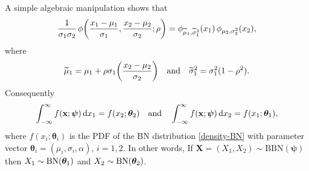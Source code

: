 \documentclass[12pt]{article}
\theoremstyle{definition}
\begin{document}
A simple algebraic manipulation shows that
\begin{align}\label{ident-binormal}
{1\over\sigma_1\sigma_2}\,
\phi\biggl({x_1-\mu_1\over \sigma_1},{x_2-\mu_2\over \sigma_2};\rho\biggr)
=
\phi_{\widetilde{\mu}_1, \widetilde{\sigma}_1^2}(x_1) \,
\phi_{\mu_2,\sigma_2^2}(x_2),
\end{align}
where
\begin{align*}
\widetilde{\mu}_1=\mu_1+\rho\sigma_1\biggl({x_2-\mu_2\over\sigma_2}\biggr)
\quad \text{and} \quad 
\widetilde{\sigma}_1^2=\sigma_1^2(1-\rho^2).
\end{align*}
Consequently
\begin{align*}
	\int_{-\infty}^{\infty}f({\bf x};\boldsymbol{\psi})\, {\rm d}x_1
	=
	f(x_2;\boldsymbol{\theta}_{2}) 
	\quad \text{and}\quad
	\int_{-\infty}^{\infty}f({\bf x};\boldsymbol{\psi})\, {\rm d}x_2
=
f(x_1;\boldsymbol{\theta}_{1}),
\end{align*}
where $f(x_i;\boldsymbol{\theta}_{i})$ is the PDF of the BN distribution \eqref{density-BN} with parameter vector $\boldsymbol{\theta}_{i}=(\mu_i,\sigma_i,\alpha)$, $i=1,2$. In other words, If $\boldsymbol{X}=(X_1,X_2)\sim \text{BBN}(\boldsymbol{\psi })$ then $X_1\sim {\rm BN}(\boldsymbol{\theta}_1)$ and $X_2\sim {\rm BN}(\boldsymbol{\theta}_2)$.
\end{document}
